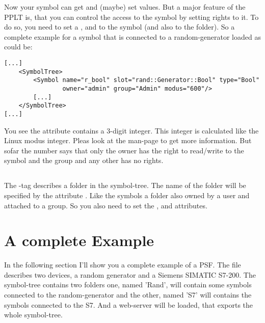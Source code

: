 Now your symbol can get and (maybe) set values. But a major feature of the PPLT is, that you can control the
access to the symbol by setting rights to it. To do so, you need to set a ,  and
 to the symbol (and also to the folder). So a complete example for a symbol that is connected to
a random-generator loaded as  could be:
\begin{verbatim}
[...]
    <SymbolTree>
        <Symbol name="r_bool" slot="rand::Generator::Bool" type="Bool" 
                owner="admin" group="Admin" modus="600"/>
        [...]
    </SymbolTree>
[...]
\end{verbatim}
You see the attribute  contains a 3-digit integer. This integer is calculated like the Linux modus integer. Pleas look
at the  man-page to get more information. But sofar the number  says that only the owner has the right to 
read/write to the symbol and the group and any other has no rights.


\subsection{}
The -tag describes a folder in the symbol-tree. The name of the folder will be specified by the
attribute . Like the symbols a folder also owned by a user and attached to a group. So you also need 
to set the ,  and  attributes. 

\newpage
\section{A complete Example}
In the following section I'll show you a complete example of a PSF. The file describes two devices, a random generator and
a Siemens SIMATIC S7-200. The symbol-tree contains two folders one, named 'Rand', will contain some symbols connected
to the random-generator and the other, named 'S7' will contains the symbols connected to the S7. And a web-server will be loaded, 
that exports the whole symbol-tree. 





